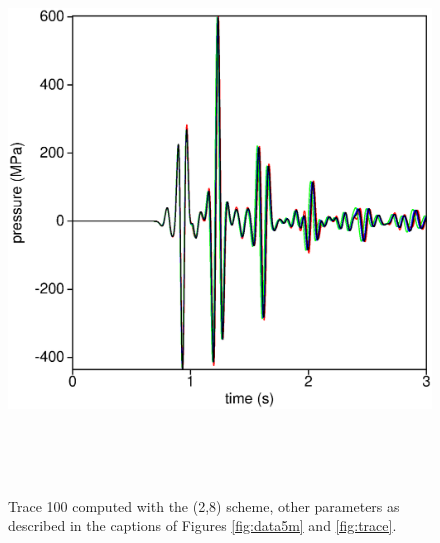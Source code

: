 \begin{figure}
\includegraphics[height=15cm,width=15cm]{./Fig/fig7.ps}
\caption{Trace 100 computed with the (2,8) scheme,
  other parameters as described in the captions of Figures
  \ref{fig:data5m} and \ref{fig:trace}.} 
\label{fig:trace8k}
\end{figure}

